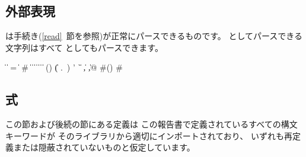\subsection{外部表現}
\label{datumsyntax}

は手続き(\ref{read}~節を参照)が正常にパースできるものです。
としてパースできる文字列はすべて
としてもパースできます。\label{datum}

\begin{grammar}%
 \:  \| 
\>  \|  =  \|  \#
 \:  \| 
\>  \|  \|  \|   \| 
 \: 
 \:  \|  \| 
 \: () \| ( .\ )
 \:  
 \: ' \| ` \| , \| ,@
 \: \#()
 \: \# %
\end{grammar}


\subsection{式}

この節および後続の節にある定義は
この報告書で定義されているすべての構文キーワードが
そのライブラリから適切にインポートされており、
いずれも再定義または隠蔽されていないものと仮定しています。

